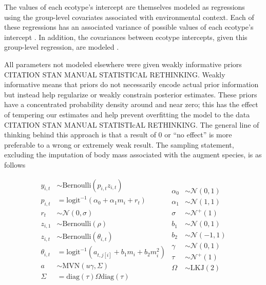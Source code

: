 \documentclass[12pt,letterpaper]{article}
\begin{document}
The values of each ecotype's intercept are themselves modeled as regressions using the group-level covariates associated with environmental context. Each of these regressions has an associated variance of possible values of each ecotype's intercept \citep{Gelman2007}. In addition, the covariances between ecotype intercepts, given this group-level regression, are modeled \citep{Gelman2007}.

All parameters not modeled elsewhere were given weakly informative priors \citep{Gelman2013d} CITATION STAN MANUAL STATISTICAL RETHINKING. Weakly informative means that priors do not necessarily encode actual prior information but instead help regularize or weakly constrain posterior estimates. These priors have a concentrated probability density around and near zero; this has the effect of tempering our estimates and help prevent overfitting the model to the data \citep{Gelman2013d} CITATION STAN MANUAL STATISTIcAL RETHINKING. The general line of thinking behind this approach is that a result of 0 or ``no effect'' is more preferable to a wrong or extremely weak result. The sampling statement, excluding the imputation of body mass associated with the augment species, is as follows

\begin{equation}
  \begin{split}
    y_{i, t} &\sim \text{Bernoulli}(p_{i, t} z_{i, t}) \\
    p_{i, t} &= \text{logit}^{-1}(\alpha_{0} + \alpha_{1} m_{i} + r_{t}) \\ 
    r_{t} &\sim \mathcal{N}(0, \sigma) \\
    z_{i, 1} &\sim \text{Bernoulli}(\rho) \\
    z_{i, t} &\sim \text{Bernoulli}(\theta_{i, t}) \\
    \theta_{i, t} &= \text{logit}^{-1}(a_{t, j[i]} + b_{1} m_{i} + b_{2} m_{i}^{2}) \\
    a &\sim \text{MVN}(u \gamma, \Sigma) \\
    \Sigma &= \text{diag}(\tau) \Omega \text{diag}(\tau) \\
  \end{split}
  \begin{split}
    \alpha_{0} &\sim \mathcal{N}(0, 1) \\
    \alpha_{1} &\sim \mathcal{N}(1, 1) \\
    \sigma &\sim \mathcal{N}^{+}(1) \\
    b_{1} &\sim \mathcal{N}(0, 1) \\
    b_{2} &\sim \mathcal{N}(-1, 1) \\
    \gamma &\sim \mathcal{N}(0, 1) \\
    \tau &\sim \mathcal{N}^{+}(1) \\
    \Omega &\sim \text{LKJ}(2) \\
  \end{split}
  \label{eq:pure_presence}
\end{equation}
\end{document}

